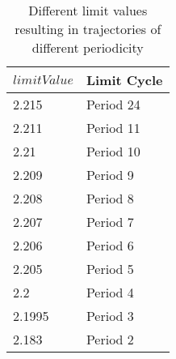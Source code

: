 \documentclass[main]{subfiles}
\begin{document}
\begin{table}[H]
\renewcommand{\arraystretch}{1.2}
\center
\begin{tabular}{@{}ll@{}}
	\toprule
   \(limitValue\) & Limit Cycle\\
   \midrule
   2.215 & Period 24 \\ 
   2.211 & Period 11 \\
   2.21  & Period 10 \\
   2.209 & Period 9 \\
   2.208 & Period 8 \\
   2.207 & Period 7 \\
   2.206 & Period 6 \\
   2.205 & Period 5 \\
   2.2 & Period 4 \\
   2.1995 & Period 3 \\
   2.183 & Period 2 \\
   \bottomrule
\end{tabular}
\caption{Different limit values resulting in trajectories of different periodicity}
\label{table:periodicities}
\end{table}
\end{document}
